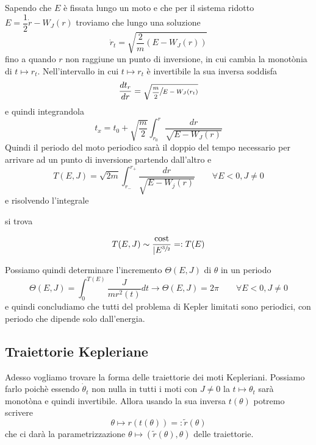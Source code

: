 \documentclass[11pt,a4paper,twoside]{book}
\theoremstyle{esss}
\theoremstyle{dotless}
\numberwithin{equation}{section} %
\begin{document}
Sapendo che $E$ è fissata lungo un moto e che per il sistema ridotto $E=\dfrac{1}{2}\dot{r}-W_J(r)$ troviamo che lungo una soluzione
\begin{equation}
\dot{r}_t=\sqrt{\dfrac{2}{m}\left(E-W_J(r)\right)}
\end{equation}
fino a quando $r$ non raggiune un punto di inversione, in cui cambia la monotònia di $t\mapsto r_t$.
Nell'intervallo in cui $t\mapsto r_t$ è invertibile la sua inversa soddisfa 
\[
\dfrac{dt_r}{dr}=\sqrt{\sfrac{\dfrac{m}{2}}{E-W_J(r_t)}}
\]
e quindi integrandola
\[
t_x=t_0+\sqrt{\dfrac{m}{2}} \int_{r_0}^{r} \dfrac{dr}{\sqrt{E-W_J(r)}}
\]
Quindi il periodo del moto periodico sarà il doppio del tempo necessario per arrivare ad un punto di inversione partendo dall'altro e
\begin{equation}
T(E,J)=\sqrt{2m} \int_{r_-}^{r_+} \dfrac{dr}{\sqrt{E-W_j(r)} } \qquad \forall E<0, J\neq0
\end{equation}
e risolvendo l'integrale\footnotemark[1]

 si trova

\[
T(E,J) \sim \dfrac{\text{cost}}{|E^{\sfrac{3}{2}}}=:T(E)
\]

Possiamo quindi determinare l'incremento $\Theta(E,J)$ di $\theta$ in un periodo
\[
\Theta(E,J)=\int_0^{T(E)} \dfrac{J}{mr^2(t)} dt \rightarrow \Theta(E,J)=2\pi \qquad \forall E<0,J\neq0
\]
e quindi concludiamo che tutti del problema di Kepler limitati sono periodici, con periodo che dipende solo dall'energia.

\subsection{Traiettorie Kepleriane}

Adesso vogliamo trovare la forma delle traiettorie dei moti Kepleriani. Possiamo farlo poichè essendo $\dot{\theta}_t$ non nulla in tutti i moti con $J\neq0$ la $t\mapsto\theta_t$ sarà monotòna e quindi invertibile. Allora usando la sua inversa $t(\theta)$ potremo scrivere
\[
\theta\mapsto r(t(\theta))=:\tilde{r}(\theta)
\]
che ci darà la parametrizzazione $\theta\mapsto(\tilde{r}(\theta),\theta)$ delle traiettorie.
\end{document}
